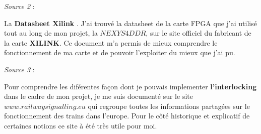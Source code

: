 \bigskip

\emph{Source 2} :

\smallskip

La \textbf{Datasheet Xilink} \cite{Xilink}. J'ai trouvé la datasheet de la
carte FPGA que j'ai utilisé tout au long de mon projet, la $NEXYS
4DDR$, sur le site officiel du fabricant de la carte \textbf{XILINK}. Ce
document m'a permis de mieux comprendre le fonctionnement de ma carte
et de pouvoir l'exploiter du mieux que j'ai pu.

\bigskip

\emph{Source 3} :

\smallskip

Pour comprendre les diférentes façon dont je pouvais implementer
\textbf{l'interlocking} dans le cadre de mon projet, je me suis documenté sur
le site $www.railwaysignalling.eu$ \cite{IXL} qui regroupe toutes les
informations partagées sur le fonctionnement des trains dans
l'europe. Pour le côté historique et explicatif de certaines notions
ce site à été très utile pour moi.


\newpage






